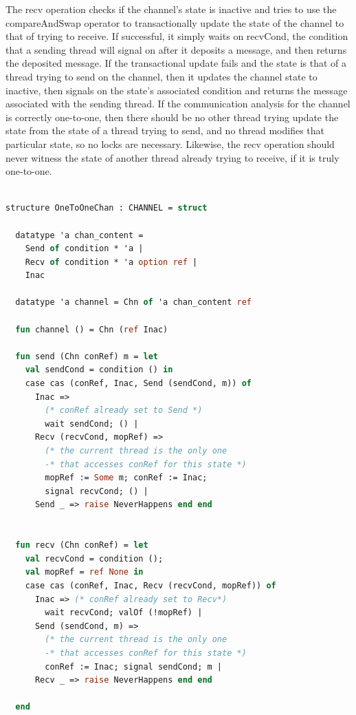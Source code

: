 \documentclass{article}
\begin{document}
The recv operation checks if the channel's state is inactive and tries to use the
compareAndSwap operator to transactionally update the state of the channel to that of trying
to receive.  If successful, it simply waits on recvCond, the condition that a sending thread
will signal on after it deposits a message, and then returns the deposited message.  If the
transactional update fails and the state is that of a thread trying to send on the channel,
then it updates the channel state to inactive, then signals on the state's associated
condition and returns the message associated with the sending thread.  If the communication
analysis for the channel is correctly one-to-one, then there should be no other thread trying
update the state from the state of a thread trying to send, and no thread modifies that
particular state, so no locks are necessary.  Likewise, the recv operation should never
witness the state of another thread already trying to receive, if it is truly one-to-one.

\begin{lstlisting}[language=ML, escapechar=\%]

structure OneToOneChan : CHANNEL = struct

  datatype 'a chan_content =
    Send of condition * 'a |
    Recv of condition * 'a option ref |
    Inac  

  datatype 'a channel = Chn of 'a chan_content ref

  fun channel () = Chn (ref Inac)

  fun send (Chn conRef) m = let
    val sendCond = condition () in
    case cas (conRef, Inac, Send (sendCond, m)) of
      Inac => 
        (* conRef already set to Send *)
        wait sendCond; () |
      Recv (recvCond, mopRef) =>
        (* the current thread is the only one
        -* that accesses conRef for this state *)
        mopRef := Some m; conRef := Inac;
        signal recvCond; () |
      Send _ => raise NeverHappens end end


  fun recv (Chn conRef) = let
    val recvCond = condition ();
    val mopRef = ref None in
    case cas (conRef, Inac, Recv (recvCond, mopRef)) of
      Inac => (* conRef already set to Recv*)
        wait recvCond; valOf (!mopRef) |
      Send (sendCond, m) =>
        (* the current thread is the only one
        -* that accesses conRef for this state *)
        conRef := Inac; signal sendCond; m |
      Recv _ => raise NeverHappens end end 

  end
  \end{lstlisting}
\end{document}
